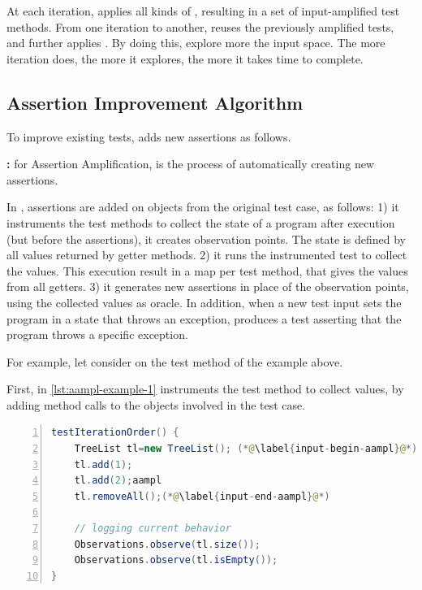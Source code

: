 At each iteration, \dspot applies all kinds of \Iampl, resulting in a set of input-amplified test methods. 
From one iteration to another, \dspot reuses the previously amplified tests, and further applies \Iampl.
By doing this, \dspot explore more the input space.
The more iteration \dspot does, the more it explores, the more it takes time to complete.

\subsection{Assertion Improvement Algorithm}
\label{subsec:dspot:algorithm:new-assertions}

To improve existing tests, \dspot adds new assertions as follows.

\textbf{\Aampl:} for Assertion Amplification, is the process of automatically creating new assertions.

In \dspot, assertions are added on objects from the original test case, as follows: 
1) it instruments the test methods to collect the state of a program after execution (but before the assertions), \ie it creates observation points. 
The state is defined by all values returned by getter methods.
2) it runs the instrumented test to collect the values.
This execution result in a map per test method, that gives the values from all getters.
3) it generates new assertions in place of the observation points, using the collected values as oracle. 
In addition, when a new test input sets the program in a state that throws an exception, \dspot produces a test asserting that the program throws a specific exception.

For example, let consider \Aampl on the test method of the example above. 

First, in \autoref{lst:aampl-example-1} \dspot instruments the test method to collect values, by adding method calls to the objects involved in the test case.

\begin{lstlisting}[caption={In \Aampl{}, the second step is to instrument and run the test to collect runtime values.},label=lst:aampl-example-1,float,language=java,numbers=left] 
testIterationOrder() {
	TreeList tl=new TreeList(); (*@\label{input-begin-aampl}@*)
	tl.add(1);
	tl.add(2);aampl
	tl.removeAll();(*@\label{input-end-aampl}@*)
	
	// logging current behavior
	Observations.observe(tl.size()); 
	Observations.observe(tl.isEmpty()); 
}
\end{lstlisting}

